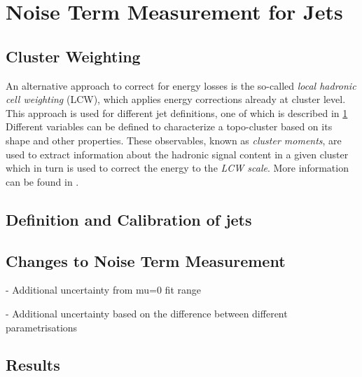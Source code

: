 \chapter{Noise Term Measurement for \Rscan Jets}
\label{app:noise-term-rscan}


\section{Cluster Weighting}
An alternative approach to correct for energy losses is the so-called \emph{local hadronic cell weighting} (LCW), which applies energy corrections already at cluster level.
This approach is used for different jet definitions, one of which is described in \cref{app:noise-term-rscan}
Different variables can be defined to characterize a topo-cluster based on its shape and other properties. These observables, known as \emph{cluster moments}, are used to extract information about the hadronic signal content in a given cluster which in turn is used to correct the energy to the \emph{LCW scale}. More information can be found in .

\section{Definition and Calibration of \Rscan jets}

\section{Changes to Noise Term Measurement}

- Additional uncertainty from mu=0 fit range

- Additional uncertainty based on the difference between different parametrisations


\section{Results}
